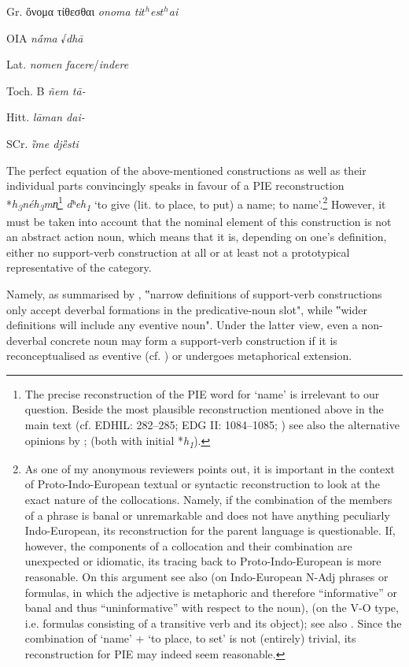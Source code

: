 \documentclass[output=paper,colorlinks,citecolor=brown]{langscibook}
\begin{document}
\ea
Gr. ὄνομα τίθεσθαι \textit{onoma ti$t^h$es$t^h$ai}

OIA \textit{nā́ma} √\textit{dhā}

Lat. \textit{nomen facere}/\textit{indere}

Toch. B \textit{ñem tā-}

Hitt. \textit{lāman dai-}

SCr. \textit{ȉme djȅsti}


\z


The perfect equation of the above-mentioned constructions as well as their individual parts convincingly speaks in favour of a PIE reconstruction *\textit{h\textsubscript{3}néh\textsubscript{3}mn̥}\footnote{The precise reconstruction of the PIE word for ‘name’ is irrelevant to our question. Beside the most plausible reconstruction mentioned above in the main text (cf. EDHIL: 282--285; EDG II: 1084--1085; \citealt[52--53]{Beek2011}) see also the alternative opinions by \citet{Stüber1997}; \citet[6]{Hackstein2002b} (both with initial *\textit{h\textsubscript{1}}).}   \textit{dʰeh\textsubscript{1}} ‘to give (lit. to place, to put) a name; to name’.\footnote{As one of my anonymous reviewers points out, it is important in the context of Proto-Indo-European textual or syntactic reconstruction to look at the exact nature of the collocations. Namely, if the combination of the members of a phrase is banal or unremarkable and does not have anything peculiarly Indo-European, its reconstruction for the parent language is questionable. If, however, the components of a collocation and their combination are unexpected or idiomatic, its tracing back to Proto-Indo-European is more reasonable. On this argument see also \citet[72--76]{Matasović1996} (on Indo-European N-Adj phrases or formulas, in which the adjective is metaphoric and therefore “informative” or banal and thus “uninformative” with respect to the noun), \citet[78--80]{Matasović1996} (on the V-O type, i.e. formulas consisting of a transitive verb and its object); see also \citet[118--124]{Ittzés2017}. Since the combination of ‘name’ + ‘to place, to set’ is not (entirely) trivial, its reconstruction for PIE may indeed seem reasonable.}
However, it must be taken into account that the nominal element of this construction is not an abstract action noun, which means that it is, depending on one’s definition, either no support-verb construction at all or at least not a prototypical representative of the category.

Namely, as summarised by \citet[383]{Fendel2023}, ‟narrow definitions of support-verb constructions only accept deverbal formations in the predicative-noun slot", while ‟wider definitions will include any eventive noun". Under the latter view, even a non-deverbal concrete noun may form a support-verb construction if it is reconceptualised as eventive (cf. \citealt{Radimský2011}) or undergoes metaphorical extension.
\end{document}
